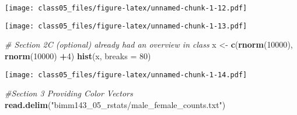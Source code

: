 \documentclass[]{article}
\newenvironment{Shaded}{\begin{snugshade}}{\end{snugshade}}
\newcommand{\CommentTok}[1]{\textcolor[rgb]{0.56,0.35,0.01}{\textit{#1}}}
\newcommand{\DataTypeTok}[1]{\textcolor[rgb]{0.13,0.29,0.53}{#1}}
\newcommand{\DecValTok}[1]{\textcolor[rgb]{0.00,0.00,0.81}{#1}}
\newcommand{\KeywordTok}[1]{\textcolor[rgb]{0.13,0.29,0.53}{\textbf{#1}}}
\newcommand{\NormalTok}[1]{#1}
\newcommand{\OperatorTok}[1]{\textcolor[rgb]{0.81,0.36,0.00}{\textbf{#1}}}
\newcommand{\OtherTok}[1]{\textcolor[rgb]{0.56,0.35,0.01}{#1}}
\newcommand{\StringTok}[1]{\textcolor[rgb]{0.31,0.60,0.02}{#1}}
\begin{document}
\texttt{[image: class05\_files/figure-latex/unnamed-chunk-1-12.pdf]}

\begin{Shaded}
\end{Shaded}

\texttt{[image: class05\_files/figure-latex/unnamed-chunk-1-13.pdf]}

\begin{Shaded}
\begin{Highlighting}[]
\CommentTok{# Section 2C (optional) already had an overview in class}
\NormalTok{x <-}\StringTok{ }\KeywordTok{c}\NormalTok{(}\KeywordTok{rnorm}\NormalTok{(}\DecValTok{10000}\NormalTok{), }\KeywordTok{rnorm}\NormalTok{(}\DecValTok{10000}\NormalTok{) }\OperatorTok{+}\DecValTok{4}\NormalTok{)}
\KeywordTok{hist}\NormalTok{(x, }\DataTypeTok{breaks =} \DecValTok{80}\NormalTok{)}
\end{Highlighting}
\end{Shaded}

\texttt{[image: class05\_files/figure-latex/unnamed-chunk-1-14.pdf]}

\begin{Shaded}
\begin{Highlighting}[]
\CommentTok{#Section 3 Providing Color Vectors}
\KeywordTok{read.delim}\NormalTok{(}\StringTok{"bimm143_05_rstats/male_female_counts.txt"}\NormalTok{)}
\end{Highlighting}
\end{Shaded}
\end{document}
